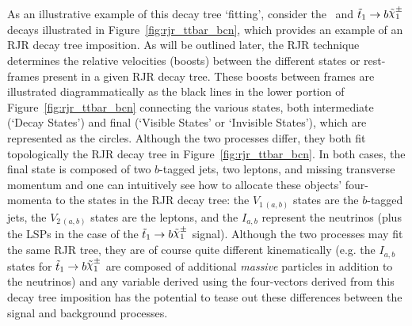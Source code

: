 As an illustrative example of this decay tree `fitting', consider the \ttbar~and $\stopone \rightarrow b \chinoonepm$
decays illustrated in Figure~\ref{fig:rjr_ttbar_bcn}, which provides an example of an RJR decay tree imposition.
As will be outlined later, the RJR technique determines the relative velocities (boosts) between
the different states or rest-frames present in a given RJR decay tree.
These boosts between frames are illustrated diagrammatically as the black lines in the lower portion of
Figure~\ref{fig:rjr_ttbar_bcn} connecting the various states, both intermediate (`Decay States')
and final (`Visible States' or `Invisible States'), which are represented as the circles.
Although the two processes differ, they both fit topologically the RJR decay tree in Figure~\ref{fig:rjr_ttbar_bcn}.
In both cases, the final state is composed of two $b$-tagged jets, two leptons, and missing transverse
momentum and one can intuitively see how to allocate these objects' four-momenta to the states in the
RJR decay tree: the $V_{1\,(a,b)}$ states
are the $b$-tagged jets, the $V_{2\,(a,b)}$ states are the leptons, and the $I_{a,b}$ represent
the neutrinos (plus the LSPs in the case of the $\stopone \rightarrow b \chinoonepm$ signal).
Although the two processes may fit the same RJR tree, they are of course quite different kinematically
(e.g. the $I_{a,b}$ states for $\stopone \rightarrow b \chinoonepm$ are composed of additional
\textit{massive} particles in addition to the neutrinos) and any variable derived using the four-vectors
derived from this decay tree imposition has the potential to tease out these differences
between the signal and background processes.

